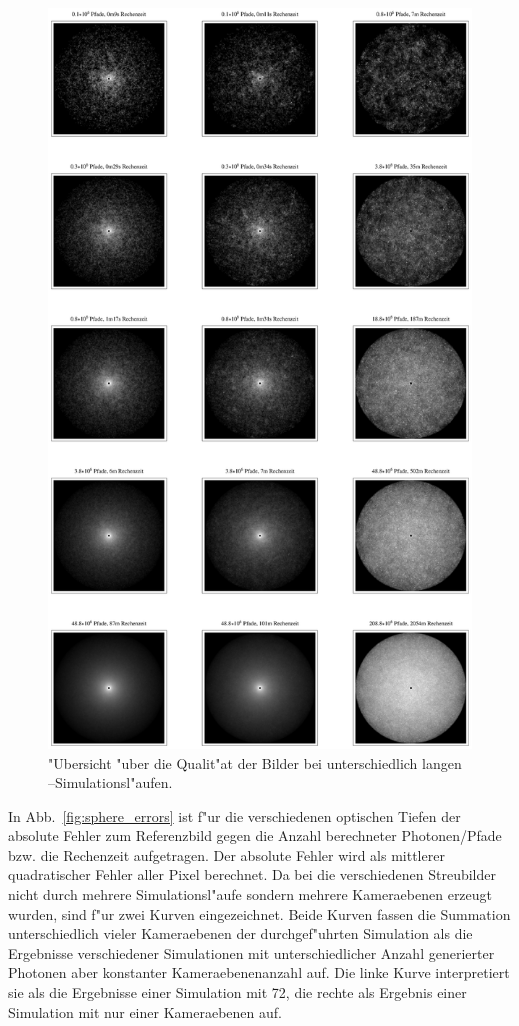 		\begin{figure}
			\centering
			\includegraphics[height=1.0\textheight]{piratesphereimageoverview.eps}
			\caption{"Ubersicht "uber die Qualit"at der Bilder bei unterschiedlich langen \pirate--Simulationsl"aufen.}
			\label{fig:pirate_sphere_imageoverview}
		\end{figure}
	
	
	In Abb.~\ref{fig:sphere_errors} ist f"ur die verschiedenen optischen Tiefen der absolute Fehler zum Referenzbild gegen die Anzahl berechneter Photonen/Pfade bzw. die Rechenzeit aufgetragen. Der absolute Fehler wird als mittlerer quadratischer Fehler aller Pixel berechnet. Da bei \mctd die verschiedenen Streubilder nicht durch mehrere Simulationsl"aufe sondern mehrere Kameraebenen erzeugt wurden, sind f"ur \mctd zwei Kurven eingezeichnet. Beide Kurven fassen die Summation unterschiedlich vieler Kameraebenen der durchgef"uhrten Simulation als die Ergebnisse verschiedener Simulationen mit unterschiedlicher Anzahl generierter Photonen aber konstanter Kameraebenenanzahl auf. Die linke Kurve interpretiert sie als die Ergebnisse einer Simulation mit 72, die rechte als Ergebnis einer Simulation mit nur einer Kameraebenen auf.
	
